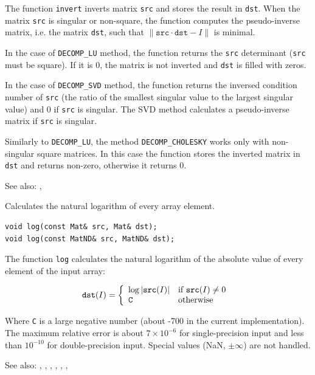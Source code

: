 The function \texttt{invert} inverts matrix \texttt{src} and stores the result in \texttt{dst}.
When the matrix \texttt{src} is singular or non-square, the function computes the pseudo-inverse matrix, i.e. the matrix \texttt{dst}, such that $\|\texttt{src} \cdot \texttt{dst} - I\|$ is minimal.

In the case of \texttt{DECOMP\_LU} method, the function returns the \texttt{src} determinant (\texttt{src} must be square). If it is 0, the matrix is not inverted and \texttt{dst} is filled with zeros.

In the case of \texttt{DECOMP\_SVD} method, the function returns the inversed condition number of \texttt{src} (the ratio of the smallest singular value to the largest singular value) and 0 if \texttt{src} is singular. The SVD method calculates a pseudo-inverse matrix if \texttt{src} is singular.

Similarly to \texttt{DECOMP\_LU}, the method \texttt{DECOMP\_CHOLESKY} works only with non-singular square matrices. In this case the function stores the inverted matrix in \texttt{dst} and returns non-zero, otherwise it returns 0.

See also: , 


\label{log}
Calculates the natural logarithm of every array element.

\begin{lstlisting}
void log(const Mat& src, Mat& dst);
void log(const MatND& src, MatND& dst);
\end{lstlisting}
\begin{description}
\end{description}

The function \texttt{log} calculates the natural logarithm of the absolute value of every element of the input array:

\[
\texttt{dst}(I) = \left\{ \begin{array}{l l} \log |\texttt{src}(I)| & \mbox{if $\texttt{src}(I) \ne 0$ }\\ \texttt{C} & \mbox{otherwise}\\ \end{array} \right.
\]

Where \texttt{C} is a large negative number (about -700 in the current implementation).
The maximum relative error is about $7 \times 10^{-6}$ for single-precision input and less than $10^{-10}$ for double-precision input. Special values (NaN, $\pm \infty$) are not handled.

See also: , , , , , , 


